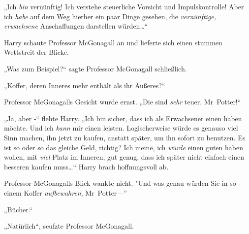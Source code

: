 „Ich \emph{bin} vernünftig! Ich verstehe steuerliche Vorsicht und Impulskontrolle! Aber ich \emph{habe} auf dem Weg hierher ein paar Dinge gesehen, die \emph{vernünftige, erwachsene} Anschaffungen darstellen würden…“

Harry schaute Professor McGonagall an und lieferte sich einen stummen Wettstreit der Blicke.

„Was zum Beispiel?“ sagte Professor McGonagall schließlich.

„Koffer, deren Inneres mehr enthält als ihr Äußeres?“

Professor McGonagalls Gesicht wurde ernst. „Die sind \emph{sehr} teuer, Mr~Potter!“

„Ja, aber -“ flehte Harry. „Ich bin sicher, dass ich als Erwachsener einen haben möchte. Und ich \emph{kann} mir einen leisten. Logischerweise würde es genauso viel Sinn machen, ihn jetzt zu kaufen, anstatt später, um ihn sofort zu benutzen. Es ist so oder so das gleiche Geld, richtig? Ich meine, ich \emph{würde} einen guten haben wollen, mit \emph{viel} Platz im Inneren, gut genug, dass ich später nicht einfach einen besseren kaufen muss…“ Harry brach hoffnungsvoll ab.

Professor McGonagalls Blick wankte nicht. "Und was genau würden Sie in so einem Koffer \emph{aufbewahren}, Mr~Potter—”

„Bücher.“

„Natürlich“, seufzte Professor McGonagall.

